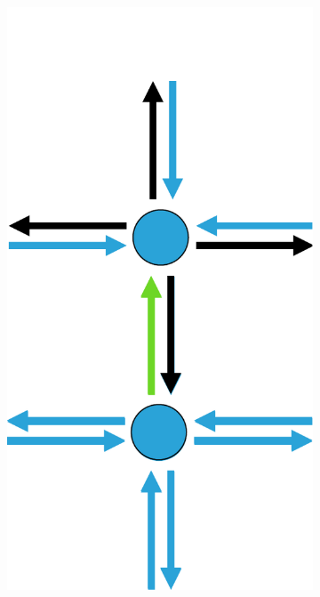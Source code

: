 \documentclass[12pt]{article}
\begin{document}
\begin{figure}[tb]
  \begin{subfigure}[b]{0.15\textwidth}
      \includegraphics[width=\textwidth]{img/2}
      \caption{}\label{fig:contraction_kernel_greedy2}
  \end{subfigure}~%
  \begin{subfigure}[b]{0.15\textwidth}

\end{subfigure}
\end{figure}
\end{document}
